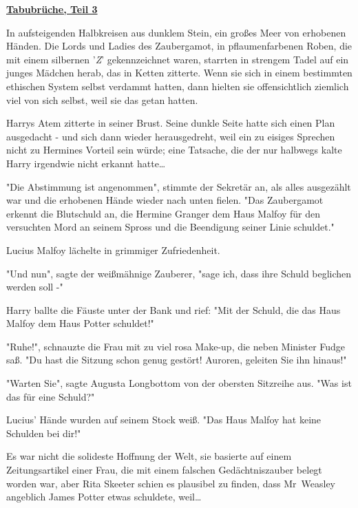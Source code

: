 

\hypertarget{tabubruxfcche-teil-3}{%

\textbf{\uline{Tabubrüche, Teil 3}}

In aufsteigenden Halbkreisen aus dunklem Stein, ein großes Meer von erhobenen Händen. Die Lords und Ladies des Zaubergamot, in pflaumenfarbenen Roben, die mit einem silbernen '\emph{Z}' gekennzeichnet waren, starrten in strengem Tadel auf ein junges Mädchen herab, das in Ketten zitterte. Wenn sie sich in einem bestimmten ethischen System selbst verdammt hatten, dann hielten sie offensichtlich ziemlich viel von sich selbst, weil sie das getan hatten.

Harrys Atem zitterte in seiner Brust. Seine dunkle Seite hatte sich einen Plan ausgedacht - und sich dann wieder herausgedreht, weil ein zu eisiges Sprechen nicht zu Hermines Vorteil sein würde; eine Tatsache, die der nur halbwegs kalte Harry irgendwie nicht erkannt hatte…

"Die Abstimmung ist angenommen", stimmte der Sekretär an, als alles ausgezählt war und die erhobenen Hände wieder nach unten fielen. "Das Zaubergamot erkennt die Blutschuld an, die Hermine Granger dem Haus Malfoy für den versuchten Mord an seinem Spross und die Beendigung seiner Linie schuldet."

Lucius Malfoy lächelte in grimmiger Zufriedenheit.

"Und nun", sagte der weißmähnige Zauberer, "sage ich, dass ihre Schuld beglichen werden soll -"

Harry ballte die Fäuste unter der Bank und rief: "Mit der Schuld, die das Haus Malfoy dem Haus Potter schuldet!"

"Ruhe!", schnauzte die Frau mit zu viel rosa Make-up, die neben Minister Fudge saß. "Du hast die Sitzung schon genug gestört! Auroren, geleiten Sie ihn hinaus!"

"Warten Sie", sagte Augusta Longbottom von der obersten Sitzreihe aus. "Was ist das für eine Schuld?"

Lucius' Hände wurden auf seinem Stock weiß. "Das Haus Malfoy hat keine Schulden bei dir!"

Es war nicht die solideste Hoffnung der Welt, sie basierte auf einem Zeitungsartikel einer Frau, die mit einem falschen Gedächtniszauber belegt worden war, aber Rita Skeeter schien es plausibel zu finden, dass Mr~Weasley angeblich James Potter etwas schuldete, weil…

}
